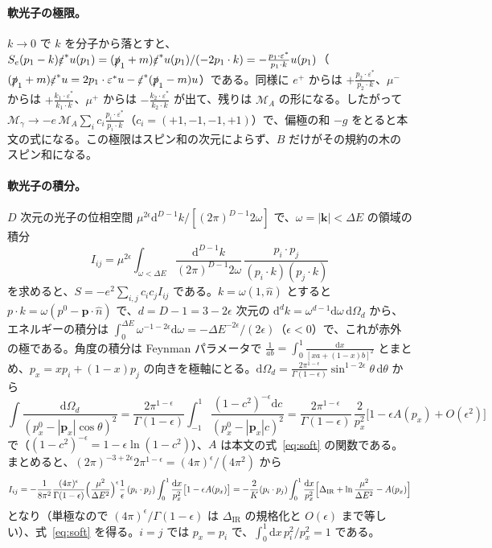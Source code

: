 \documentclass[a4paper,10pt]{ltjsarticle}
\newcommand{\dd}{\mathrm{d}}
\newcommand{\DIR}{\Delta_{\mathrm{IR}}}
\begin{document}
\paragraph{軟光子の極限。}$k\to0$ で $k$ を分子から落とすと、$S_e(p_1-k)\slashed\varepsilon^*u(p_1)=(\slashed p_1+m)\slashed\varepsilon^*u(p_1)/(-2p_1\cdot k)=-\frac{p_1\cdot\varepsilon^*}{p_1\cdot k}u(p_1)$（$(\slashed p_1+m)\slashed\varepsilon^*u=2p_1\cdot\varepsilon^*u-\slashed\varepsilon^*(\slashed p_1-m)u$）である。同様に $e^+$ からは $+\frac{p_2\cdot\varepsilon^*}{p_2\cdot k}$、$\mu^-$ からは $+\frac{k_1\cdot\varepsilon^*}{k_1\cdot k}$、$\mu^+$ からは $-\frac{k_2\cdot\varepsilon^*}{k_2\cdot k}$ が出て、残りは $\mathcal M_A$ の形になる。したがって $\mathcal M_\gamma\to-e\,\mathcal M_A\sum_ic_i\frac{p_i\cdot\varepsilon^*}{p_i\cdot k}$（$c_i=(+1,-1,-1,+1)$）で、偏極の和 $-g$ をとると本文の式になる。この極限はスピン和の次元によらず、$B$ だけがその規約の木のスピン和になる。

\paragraph{軟光子の積分。}$D$ 次元の光子の位相空間 $\mu^{2\epsilon}\dd^{D-1}k/[(2\pi)^{D-1}2\omega]$ で、$\omega=|\boldsymbol k|<\Delta E$ の領域の積分
\begin{equation*}
I_{ij}=\mu^{2\epsilon}\int_{\omega<\Delta E}\frac{\dd^{D-1}k}{(2\pi)^{D-1}2\omega}\,\frac{p_i\cdot p_j}{(p_i\cdot k)(p_j\cdot k)}
\end{equation*}
を求めると、$S=-e^2\sum_{i,j}c_ic_jI_{ij}$ である。$k=\omega(1,\hat n)$ とすると $p\cdot k=\omega(p^0-\boldsymbol p\cdot\hat n)$ で、$d=D-1=3-2\epsilon$ 次元の $\dd^dk=\omega^{d-1}\dd\omega\,\dd\Omega_d$ から、エネルギーの積分は $\int_0^{\Delta E}\omega^{-1-2\epsilon}\dd\omega=-\Delta E^{-2\epsilon}/(2\epsilon)$（$\epsilon<0$）で、これが赤外の極である。角度の積分は Feynman パラメータで $\frac{1}{ab}=\int_0^1\frac{\dd x}{[xa+(1-x)b]^2}$ とまとめ、$p_x=xp_i+(1-x)p_j$ の向きを極軸にとる。$\dd\Omega_d=\frac{2\pi^{1-\epsilon}}{\Gamma(1-\epsilon)}\sin^{1-2\epsilon}\theta\,\dd\theta$ から
\begin{equation*}
\int\frac{\dd\Omega_d}{(p_x^0-|\boldsymbol p_x|\cos\theta)^2}=\frac{2\pi^{1-\epsilon}}{\Gamma(1-\epsilon)}\int_{-1}^1\frac{(1-c^2)^{-\epsilon}\dd c}{(p_x^0-|\boldsymbol p_x|c)^2}
=\frac{2\pi^{1-\epsilon}}{\Gamma(1-\epsilon)}\,\frac{2}{p_x^2}\bigl[1-\epsilon A(p_x)+O(\epsilon^2)\bigr]
\end{equation*}
で（$(1-c^2)^{-\epsilon}=1-\epsilon\ln(1-c^2)$）、$A$ は本文の式~\eqref{eq:soft} の関数である。まとめると、$(2\pi)^{-3+2\epsilon}2\pi^{1-\epsilon}=(4\pi)^\epsilon/(4\pi^2)$ から
\begin{equation*}
I_{ij}=-\frac{1}{8\pi^2}\frac{(4\pi)^\epsilon}{\Gamma(1-\epsilon)}\Bigl(\frac{\mu^2}{\Delta E^2}\Bigr)^\epsilon\frac1\epsilon\,(p_i\cdot p_j)\int_0^1\frac{\dd x}{p_x^2}\bigl[1-\epsilon A(p_x)\bigr]
=-\frac2K(p_i\cdot p_j)\int_0^1\frac{\dd x}{p_x^2}\Bigl[\DIR+\ln\frac{\mu^2}{\Delta E^2}-A(p_x)\Bigr]
\end{equation*}
となり（単極なので $(4\pi)^\epsilon/\Gamma(1-\epsilon)$ は $\DIR$ の規格化と $O(\epsilon)$ まで等しい）、式~\eqref{eq:soft} を得る。$i=j$ では $p_x=p_i$ で、$\int_0^1\dd x\,p_i^2/p_x^2=1$ である。
\end{document}

